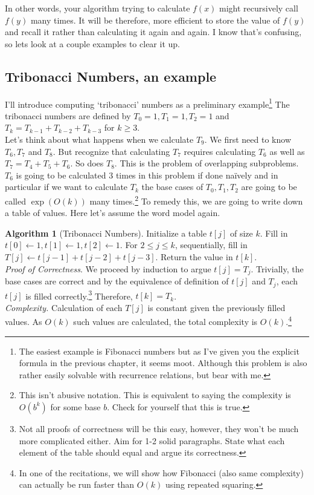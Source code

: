 \documentclass[11pt]{article}
\theoremstyle{plain}
\theoremstyle{definition}
\newtheorem{alg}[thm]{Algorithm}
\numberwithin{equation}{section}
\numberwithin{figure}{section}
\begin{document}
\noindent \noindent In other words, your algorithm trying to calculate $f(x)$ might recursively call $f(y)$ many times. It will be therefore, more efficient to store the value of $f(y)$ and recall it rather than calculating it again and again. I know that's confusing, so lets look at a couple examples to clear it up. 

\subsection{Tribonacci Numbers, an example}
\noindent I'll introduce computing `tribonacci' numbers as a preliminary example\footnote{The easiest example is Fibonacci numbers but as I've given you the explicit formula in the previous chapter, it seems moot. Although this problem is also rather easily solvable with recurrence relations, but bear with me.} The tribonacci numbers are defined by $T_0 = 1, T_1 = 1, T_2 = 1$ and $T_k = T_{k -1} + T_{k-2} + T_{k - 3}$ for $k \geq 3$. \\

\noindent Let's think about what happens when we calculate $T_9$. We first need to know $T_6, T_7$ and $T_8$. But recognize that calculating $T_7$ requires calculating $T_6$ as well as $T_7 = T_4 + T_5 + T_6$. So does $T_8$. This is the problem of overlapping subproblems. $T_6$ is going to be calculated 3 times in this problem if done na\"ively and in particular if we want to calculate $T_k$ the base cases of $T_0, T_1, T_2$ are going to be called $\exp(O(k))$ many times.\footnote{This isn't abusive notation. This is equivalent to saying the complexity is $O(b^k)$ for some base $b$. Check for yourself that this is true.} To remedy this, we are going to write down a table of values. Here let's assume the word model again.

\begin{alg}[Tribonacci Numbers]
Initialize a table $t[j]$ of size $k$. Fill in $t[0] \leftarrow 1, t[1] \leftarrow 1, t[2] \leftarrow 1$. For $2 \leq j \leq k$, sequentially, fill in $T[j] \leftarrow t[j-1] + t[j-2] + t[j-3]$. Return the value in $t[k]$. \\

\noindent \textit{Proof of Correctness}. We proceed by induction to argue $t[j] = T_j$. Trivially, the base cases are correct and by the equivalence of definition of $t[j]$ and $T_j$, each $t[j]$ is filled correctly.\footnote{Not all proofs of correctness will be this easy, however, they won't be much more complicated either. Aim for 1-2 solid paragraphs. State what each element of the table should equal and argue its correctness.} Therefore, $t[k] = T_k$. \\

\noindent \textit{Complexity.} Calculation of each $T[j]$ is constant given the previously filled values. As $O(k)$ such values are calculated, the total complexity is $O(k)$.\footnote{In one of the recitations, we will show how Fibonacci (also same complexity) can actually be run faster than $O(k)$ using repeated squaring.}
\end{alg}
\end{document}
